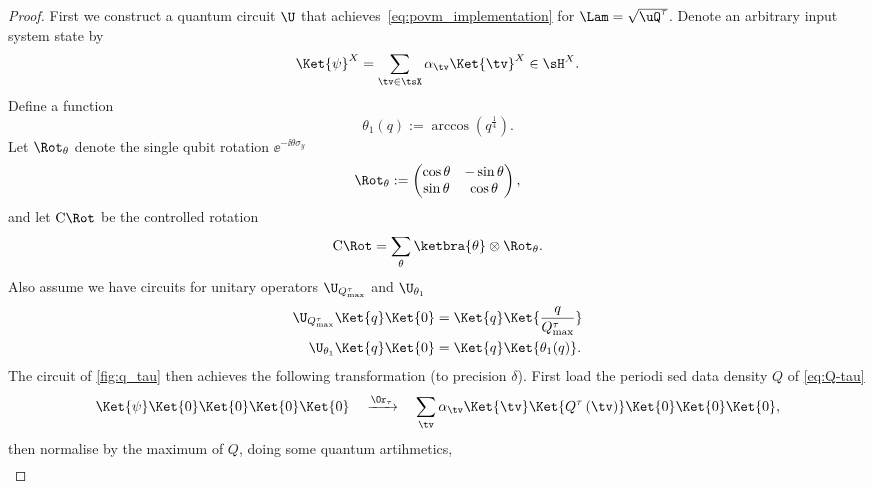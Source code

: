 \begin{proof}
  First we construct a quantum circuit $\U$ that achieves~\cref{eq:povm_implementation} for $\Lam=\sqrt{\uQ^{\tau}}$.
  Denote an arbitrary input system state by
  \begin{equation}
    \Ket{\psi}^X=\sum_{\tv\in\tsX}\alpha_{\tv}\Ket{\tv}^X\in\sH^X.
  \end{equation}
  Define a function
  \begin{equation}
    \theta_1\left(q\right):=\arccos\left({q}^{\frac{1}{4}}\right).
  \end{equation}
  Let $\Rot_\theta$ denote the single qubit rotation $\ee^{-\ii\theta\sigma_y}$
  \begin{equation}
    \label{eq:rotation}
    \Rot_\theta:=\left(\begin{matrix}\cos\theta & -\sin\theta \\
    \sin\theta & \cos\theta\end{matrix}\right),
  \end{equation}
  and let $\mathrm{C}\Rot$ be the controlled rotation
  \begin{equation}
    \label{eq:controlled_rotation_q_tau}
    \mathrm{C}\Rot=\sum_{\theta}\ketbra{\theta}\otimes \Rot_\theta.
  \end{equation}
  Also assume we have circuits for unitary operators $\U_{Q_{\max}^{\tau}}$ and $\U_{\theta_1}$ %
  \begin{align}
    \U_{Q_{\max}^{\tau}}\Ket{q}\Ket{0} &= \Ket{q}\Ket{\frac{q}{Q_{\max}^{\tau}}}\nonumber\\
    \U_{\theta_1}\Ket{q}\Ket{0} &= \Ket{q}\Ket{\theta_1(q)}.
  \end{align}
  The circuit of \cref{fig:q_tau} then achieves the following transformation (to precision $\delta$). First load the periodi  sed data density $Q$ of \cref{eq:Q-tau} %
  \begin{align}
    \label{eq:0}
    \Ket{\psi}\Ket{0}\Ket{0}\Ket{0}\Ket{0}\quad
          \xrightarrow{  \Or_\tau  }\quad\sum_{\tv}\alpha_{\tv}\Ket{\tv}\Ket{Q^{\tau}\left(\tv\right)}\Ket{0}\Ket{0}\Ket{0},
  \end{align}
  then normalise by the maximum of $Q$, doing some quantum artihmetics,
  \begin{align}
    \label{eq:2}

\end{align}
\end{proof}
